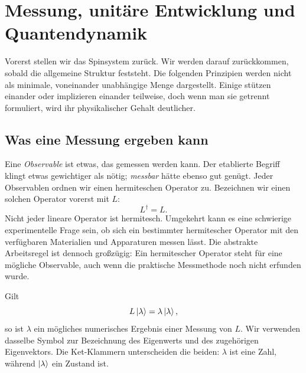 \chapter{Messung, unitäre Entwicklung und Quantendynamik}


Vorerst stellen wir das Spinsystem zurück. Wir werden darauf zurückkommen, sobald die allgemeine Struktur feststeht. Die folgenden Prinzipien werden nicht als minimale, voneinander unabhängige Menge dargestellt. Einige stützen einander oder implizieren einander teilweise, doch wenn man sie getrennt formuliert, wird ihr physikalischer Gehalt deutlicher.

\section{Was eine Messung ergeben kann}

Eine \emph{Observable} ist etwas, das gemessen werden kann. Der etablierte Begriff klingt etwas gewichtiger als nötig; \emph{messbar} hätte ebenso gut genügt. Jeder Observablen ordnen wir einen hermiteschen Operator zu. Bezeichnen wir einen solchen Operator vorerst mit \(L\):
\begin{equation}
L^\dagger=L.
\end{equation}
Nicht jeder lineare Operator ist hermitesch. Umgekehrt kann es eine schwierige experimentelle Frage sein, ob sich ein bestimmter hermitescher Operator mit den verfügbaren Materialien und Apparaturen messen lässt. Die abstrakte Arbeitsregel ist dennoch großzügig: Ein hermitescher Operator steht für eine mögliche Observable, auch wenn die praktische Messmethode noch nicht erfunden wurde.

Gilt
\begin{equation}
L\left\lvert\lambda\right\rangle=\lambda\left\lvert\lambda\right\rangle,
\end{equation}
so ist \(\lambda\) ein mögliches numerisches Ergebnis einer Messung von \(L\). Wir verwenden dasselbe Symbol zur Bezeichnung des Eigenwerts und des zugehörigen Eigenvektors. Die Ket-Klammern unterscheiden die beiden: \(\lambda\) ist eine Zahl, während \(\left\lvert\lambda\right\rangle\) ein Zustand ist.

